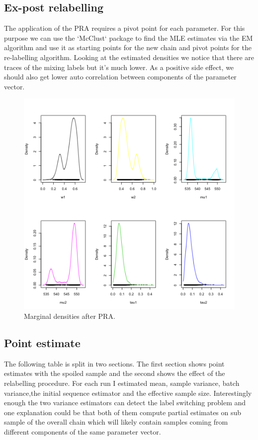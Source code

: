 \documentclass{article}
\begin{document}
\subsection{Ex-post relabelling}
The application of the PRA requires a pivot point for each parameter. For this purpose we can use the `McClust` package to find the MLE estimates via the EM algorithm and use it as starting points for the new chain and pivot points for the re-labelling algorithm. Looking at the estimated densities we notice that there are traces of the mixing labels but it's much lower. As a positive side effect, we should also get lower auto correlation between components of the parameter vector.

\begin{figure}[h!]
    \centering
    \includegraphics[width=.7\textwidth]{plot_7.png}
    \caption{Marginal densities after PRA.}
    \label{Monkey measurement}
\end{figure}

\subsection{Point estimate}
The following table is split in two sections. The first section shows point estimates with the spoiled sample and the second shows the effect of the relabelling procedure.
For each run I estimated mean, sample variance, batch variance,the initial sequence estimator and the effective sample size. Interestingly enough the two variance estimators can detect the label switching problem and one explanation could be that both of them compute partial estimates on sub sample of the overall chain which will likely contain samples coming from different components of the same parameter vector.
\end{document}
